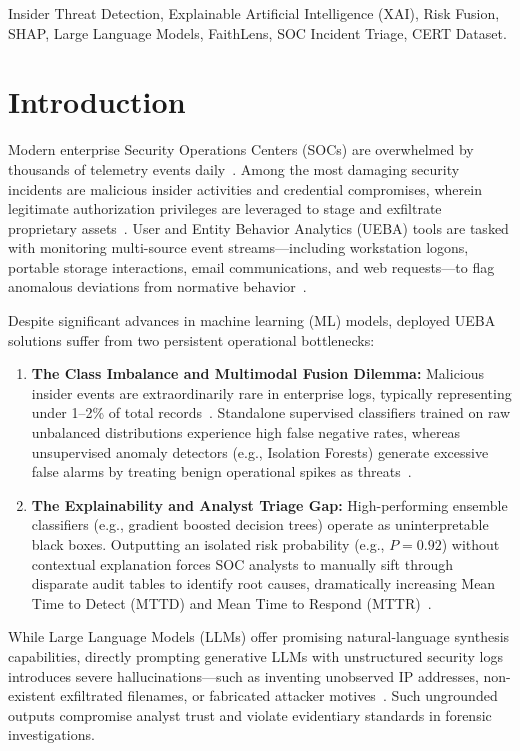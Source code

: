 \documentclass[conference]{IEEEtran}
\begin{document}
\begin{IEEEkeywords}
Insider Threat Detection, Explainable Artificial Intelligence (XAI), Risk Fusion, SHAP, Large Language Models, FaithLens, SOC Incident Triage, CERT Dataset.
\end{IEEEkeywords}

\section{Introduction}
\label{sec:intro}
Modern enterprise Security Operations Centers (SOCs) are overwhelmed by thousands of telemetry events daily~\cite{yadav2025artificial}. Among the most damaging security incidents are malicious insider activities and credential compromises, wherein legitimate authorization privileges are leveraged to stage and exfiltrate proprietary assets~\cite{alzaabi2024review}. User and Entity Behavior Analytics (UEBA) tools are tasked with monitoring multi-source event streams---including workstation logons, portable storage interactions, email communications, and web requests---to flag anomalous deviations from normative behavior~\cite{glasser2013cert}.

Despite significant advances in machine learning (ML) models, deployed UEBA solutions suffer from two persistent operational bottlenecks:
\begin{enumerate}
    \item \textbf{The Class Imbalance and Multimodal Fusion Dilemma:} Malicious insider events are extraordinarily rare in enterprise logs, typically representing under 1--2\% of total records~\cite{glasser2013cert}. Standalone supervised classifiers trained on raw unbalanced distributions experience high false negative rates, whereas unsupervised anomaly detectors (e.g., Isolation Forests) generate excessive false alarms by treating benign operational spikes as threats~\cite{ibraheem2025ransomware}.
    \item \textbf{The Explainability and Analyst Triage Gap:} High-performing ensemble classifiers (e.g., gradient boosted decision trees) operate as uninterpretable black boxes. Outputting an isolated risk probability (e.g., $P = 0.92$) without contextual explanation forces SOC analysts to manually sift through disparate audit tables to identify root causes, dramatically increasing Mean Time to Detect (MTTD) and Mean Time to Respond (MTTR)~\cite{phan2026deepfaith, ribeiro2016should}.
\end{enumerate}

While Large Language Models (LLMs) offer promising natural-language synthesis capabilities, directly prompting generative LLMs with unstructured security logs introduces severe hallucinations---such as inventing unobserved IP addresses, non-existent exfiltrated filenames, or fabricated attacker motives~\cite{si2024faithlens}. Such ungrounded outputs compromise analyst trust and violate evidentiary standards in forensic investigations.
\end{document}

